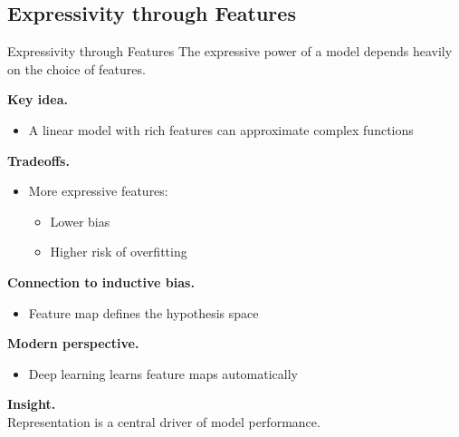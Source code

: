 \documentclass[aspectratio=169,11pt]{beamer}
\begin{document}
\subsection{Expressivity through Features}
\begin{frame}[t,allowframebreaks]{Expressivity through Features}
\small
The expressive power of a model depends heavily on the choice of features.

\textbf{Key idea.}\\ \begin{itemize}
    \item A linear model with rich features can approximate complex functions
\end{itemize}

\textbf{Tradeoffs.}\\ \begin{itemize}
    \item More expressive features:
    \begin{itemize}
        \item Lower bias
        \item Higher risk of overfitting
    \end{itemize}
\end{itemize}

\textbf{Connection to inductive bias.}\\ \begin{itemize}
    \item Feature map defines the hypothesis space
\end{itemize}

\textbf{Modern perspective.}\\ \begin{itemize}
    \item Deep learning learns feature maps automatically
\end{itemize}

\textbf{Insight.}\\ Representation is a central driver of model performance.
\end{frame}
\end{document}
